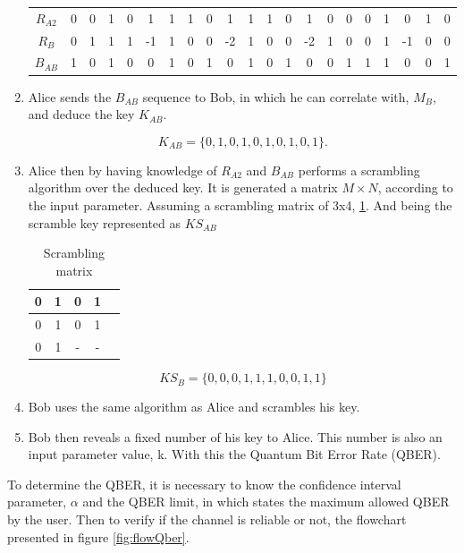 \begin{refsection}
\begin{enumerate}
	\begin{table}[H]
		\centering
		\begin{tabular}{c|c c c c c c c c c c c c c c c c c c c c}
			$R_{A2}$ & 0 & 0 & 1 & 0 &  1 & 1 & 1 & 0 &  1 & 1 & 1 & 0 &  1 & 0 & 0 & 0 & 1 &  0 & 1 & 0 \\
			$R_{B}$  & 0 & 1 & 1 & 1 & -1 & 1 & 0 & 0 & -2 & 1 & 0 & 0 & -2 & 1 & 0 & 0 & 1 & -1 & 0 & 0 \\ \hline
			$B_{AB}$ & 1 & 0 & 1 & 0 &  0 & 1 & 0 & 1 &  0 & 1 & 0 & 1 &  0 & 0 & 1 & 1 & 1 &  0 & 0 & 1 \\
		\end{tabular}
	\end{table}

	\item Alice sends the $B_{AB}$ sequence to Bob, in which he can correlate with, $M_{B}$, and deduce the key $K_{AB}$.
	
			$$ K_{AB} = \{0,1,0,1,0,1,0,1,0,1\}.$$
	
	\item Alice then by having knowledge of $R_{A2}$ and $B_{AB}$ performs a scrambling algorithm over the deduced key. It is generated a matrix $M \times N$, according to the input parameter. Assuming a scrambling matrix of 3x4, \ref{tb:scram}. And being the scramble key represented as $KS_{AB}$
	
	\begin{table}[hbt]
		\centering
		\caption{Scrambling matrix}
		\label{tb:scram}
		\begin{tabular}{|c|c|c|c|c|}
			\hline
				0 & 1 & 0 & 1 \\ \hline
			    0 & 1 & 0 & 1 \\ \hline
				0 & 1 & - & - \\ \hline
		\end{tabular}
	\end{table}

	$$KS_{B} = \{0,0,0,1,1,1,0,0,1,1\}$$	
	
	\item Bob uses the same algorithm as Alice and scrambles his key.
	
	\item Bob then reveals a fixed number of his key to Alice. This number is also an input parameter value, k. With this the Quantum Bit Error Rate (QBER).
		
\end{enumerate}

	To determine the QBER, it is necessary to know the confidence interval parameter, $\alpha$ and the QBER limit, in which states the maximum allowed QBER by the user.
	Then to verify if the channel is reliable or not, the flowchart presented in figure \ref{fig:flowQber}.
	

\end{refsection}
